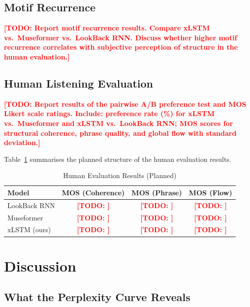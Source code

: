 \documentclass[conference]{IEEEtran}
\newcommand{\TODO}[1]{\textcolor{red}{\textbf{[TODO: #1]}}}
\begin{document}
\subsection{Motif Recurrence}
\label{ssec:motif}

\TODO{Report motif recurrence results. Compare xLSTM vs.\ Museformer
vs.\ LookBack RNN. Discuss whether higher motif recurrence correlates
with subjective perception of structure in the human evaluation.}

\subsection{Human Listening Evaluation}
\label{ssec:human}

\TODO{Report results of the pairwise A/B preference test and MOS Likert
scale ratings. Include: preference rate (\%) for xLSTM vs.\ Museformer
and xLSTM vs.\ LookBack RNN; MOS scores for structural coherence, phrase
quality, and global flow with standard deviation.}

Table~\ref{tab:human_eval} summarises the planned structure of the human
evaluation results.

\begin{table}[t]
  \caption{Human Evaluation Results (Planned)}
  \label{tab:human_eval}
  \centering
  \renewcommand{\arraystretch}{1.2}
  \begin{tabular}{@{}lccc@{}}
    \toprule
    \textbf{Model} & \textbf{MOS (Coherence)} & \textbf{MOS (Phrase)} & \textbf{MOS (Flow)} \\
    \midrule
    LookBack RNN \cite{waite2016} & \TODO{} & \TODO{} & \TODO{} \\
    Museformer \cite{yu2022}      & \TODO{} & \TODO{} & \TODO{} \\
    xLSTM (ours)                  & \TODO{} & \TODO{} & \TODO{} \\
    \bottomrule
  \end{tabular}
\end{table}

\section{Discussion}
\label{sec:discussion}

\subsection{What the Perplexity Curve Reveals}
\end{document}
